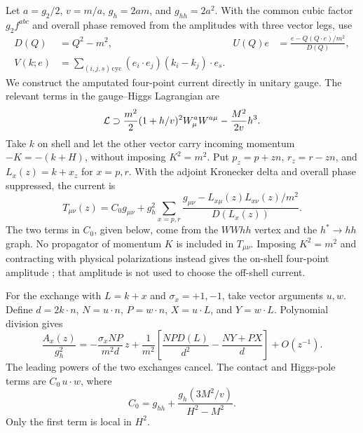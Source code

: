\documentclass[11pt,a4paper]{article}
\newcommand{\sg}{\sigma}
\begin{document}
Let \(a=g_2/2\), \(v=m/a\), \(g_h=2am\), and \(g_{hh}=2a^2\).
With the common cubic factor \(g_2 f^{abc}\) and overall phase
removed from the amplitudes with three vector legs, use
\begin{align}
 D(Q)&=Q^2-m^2, &
 U(Q)e&=\frac{e-Q(Q\cdot e)/m^2}{D(Q)},\\
 V(k;e)&=\sum_{(i,j,s)\,\mathrm{cyc}}
       (e_i\cdot e_j)(k_i-k_j)\cdot e_s .
\end{align}
We construct the amputated four-point current directly in unitary
gauge. The relevant terms in the gauge--Higgs Lagrangian
\cite{Denner} are
\[
 {\cal L}\supset \frac{m^2}{2}(1+h/v)^2 W_\mu^a W^{a\mu}
                  -\frac{M^2}{2v}h^3 .
\]
Take \(k\) on shell and let the other vector carry incoming momentum
\(-K=-(k+H)\), without imposing \(K^2=m^2\). Put \(p_z=p+zn\),
\(r_z=r-zn\), and \(L_x(z)=k+x_z\) for \(x=p,r\). With the adjoint
Kronecker delta and overall phase suppressed, the current is
\begin{equation}
 T_{\mu\nu}(z)=C_0g_{\mu\nu}
  +g_h^2\sum_{x=p,r}
  \frac{g_{\mu\nu}-L_{x\mu}(z)L_{x\nu}(z)/m^2}{D(L_x(z))}.
 \label{eq:amputated-current}
\end{equation}
The two terms in \(C_0\), given below, come from the \(WWhh\)
vertex and the \(h^*\to hh\) graph. No propagator of momentum \(K\)
is included in \(T_{\mu\nu}\). Imposing \(K^2=m^2\) and contracting
with physical polarizations instead gives the on-shell four-point
amplitude \cite{Balkin}; that amplitude is not used to choose the
off-shell current.

For the exchange with \(L=k+x\) and \(\sg_x=+1,-1\), take
vector arguments \(u,w\). Define
\(d=2k\cdot n\), \(N=u\cdot n\), \(P=w\cdot n\), \(X=u\cdot L\),
and \(Y=w\cdot L\). Polynomial division gives
\begin{equation}
 \frac{A_x(z)}{g_h^2}=
 -\frac{\sg_x NP}{m^2d}\,z
 +\frac{1}{m^2}\left[\frac{NP D(L)}{d^2}
                     -\frac{NY+PX}{d}\right]+O(z^{-1}) .
 \label{eq:division}
\end{equation}
The leading powers of the two exchanges cancel. The contact and
Higgs-pole terms are
\(C_0\,u\cdot w\), where
\begin{equation}
 C_0=g_{hh}+\frac{g_h(3M^2/v)}{H^2-M^2}.
 \label{eq:c0}
\end{equation}
Only the first term is local in \(H^2\).
\end{document}
